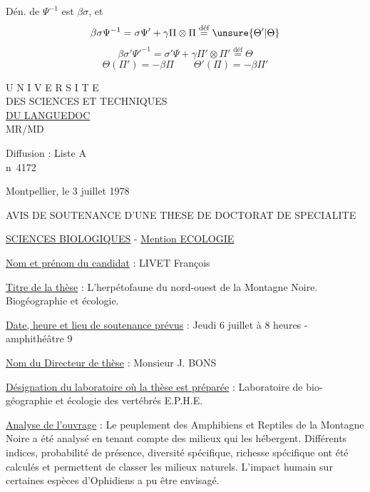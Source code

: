 Dén. de \(\Psi^{-1}\) est \(\beta\sigma\), et
\[
\beta\sigma\Psi^{-1}=\sigma\Psi'+\gamma\Pi\otimes\Pi
\overset{\text{déf}}=\unsure{\Theta'|\Theta}
\]
\[
\beta\sigma'\Psi'^{-1}=\sigma'\Psi+\gamma\Pi'\otimes\Pi'
\overset{\text{déf}}=\Theta
\]
\[
\Theta(\Pi')=-\beta\Pi\qquad\Theta'(\Pi)=-\beta\Pi'
\]

\begin{center}
U N I V E R S I T E\\
DES SCIENCES ET TECHNIQUES\\
\uline{DU LANGUEDOC}\\
MR/MD
\end{center}
Diffusion : Liste A\\
n\textdegree\ 4172

Montpellier, le 3 juillet 1978

\begin{center}
AVIS DE SOUTENANCE D'UNE THESE DE DOCTORAT DE SPECIALITE

\uline{SCIENCES BIOLOGIQUES} - \uline{Mention ECOLOGIE}
\end{center}

\uline{Nom et prénom du candidat} : LIVET François

\uline{Titre de la thèse} : L'herpétofaune du nord-ouest de la Montagne Noire.
Biogéographie et écologie.

\uline{Date, heure et lieu de soutenance prévus} : Jeudi 6 juillet à 8 heures -
amphithéâtre 9

\uline{Nom du Directeur de thèse} : Monsieur J. BONS

\uline{Désignation du laboratoire où la thèse est préparée} : Laboratoire de bio-\\
géographie et écologie des vertébrés E.P.H.E.

\uline{Analyse de l'ouvrage} : Le peuplement des Amphibiens et Reptiles de la Montagne
Noire a été analysé en tenant compte des milieux qui les hébergent.
Différents indices, probabilité de présence, diversité spécifique, richesse
spécifique ont été calculés et permettent de classer les milieux naturels.
L'impact humain sur certaines espèces d'Ophidiens a pu être envisagé.

